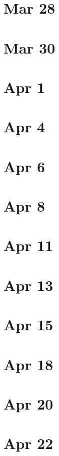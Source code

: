\documentclass{amsart}
\newcommand{\<}{\langle}
\renewcommand{\>}{\rangle}
\theoremstyle{plain}
\theoremstyle{definition}
\theoremstyle{remark}
\begin{document}
\section{Mar 28}

\section{Mar 30}

\section{Apr 1}

\section{Apr 4}

\section{Apr 6}

\section{Apr 8}

\section{Apr 11}

\section{Apr 13}

\section{Apr 15}

\section{Apr 18}

\section{Apr 20}

\section{Apr 22}
\end{document}
